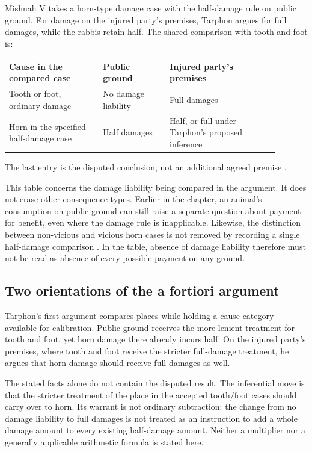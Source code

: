 Mishnah V takes a horn-type damage case with the half-damage rule on
public ground. For damage on the injured party's premises, Tarphon
argues for full damages, while the rabbis retain half. The shared
comparison with tooth and foot is:
\begin{center}
\begin{tabular}{p{0.31\linewidth}p{0.22\linewidth}p{0.36\linewidth}}
\hline
Cause in the compared case & Public ground & Injured party's premises\\
\hline
Tooth or foot, ordinary damage & No damage liability & Full damages\\
Horn in the specified half-damage case & Half damages &
Half, or full under Tarphon's proposed inference\\
\hline
\end{tabular}
\end{center}
The last entry is the disputed conclusion, not an additional agreed
premise \parencite[pp.~50--51]{RodkinsonBabaKamaCopyright1900}.

This table concerns the damage liability being compared in the
argument. It does not erase other consequence types. Earlier in
the chapter, an animal's consumption on public ground can still
raise a separate question about payment for benefit, even where
the damage rule is inapplicable. Likewise, the distinction between
non-vicious and vicious horn cases is not removed by recording a
single half-damage comparison
\parencite[pp.~37--40, 47--50]{RodkinsonBabaKamaCopyright1900}.
In the table, absence of damage liability therefore must not be read as
absence of every possible payment on any ground.

\subsection{Two orientations of the a fortiori argument}
\label{sec:p18-talmudic-qal-vahomer}

Tarphon's first argument compares places while holding a cause
category available for calibration. Public ground receives the
more lenient treatment for tooth and foot, yet horn damage there
already incurs half. On the injured party's premises, where tooth
and foot receive the stricter full-damage treatment, he argues that
horn damage should receive full damages as well.

The stated facts alone do not contain the disputed result. The
inferential move is that the stricter treatment of the place in the
accepted tooth/foot cases should carry over to horn. Its warrant is
not ordinary subtraction: the change from no damage liability to
full damages is not treated as an instruction to add a whole damage
amount to every existing half-damage amount. Neither a multiplier
nor a generally applicable arithmetic formula is stated here.


